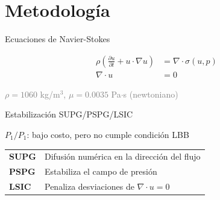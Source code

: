 \documentclass[aspectratio=169, 11pt]{beamer}
\begin{document}
\section{Metodología}

\begin{frame}{Ecuaciones de Navier-Stokes}

  \centering
  \vspace{0.3cm}
  \begin{align*}
    \rho\left(\frac{\partial u}{\partial t}+ u \cdot \nabla u\right) &= \nabla \cdot \sigma(u,p) \\
    \nabla \cdot u &= 0
  \end{align*}

  \vspace{0.3cm}
  \textcolor{gray}{\small $\rho = 1060$ kg/m$^3$, $\mu = 0.0035$ Pa$\cdot$s (newtoniano)}

  \vfill
\end{frame}

\begin{frame}{Estabilización SUPG/PSPG/LSIC}

  \centering
  \vfill
  {\small $P_1/P_1$: bajo costo, pero no cumple condici\'on LBB}

  \vspace{0.3cm}
  \begin{tabular}{ll}
    \textbf{SUPG} & Difusi\'on num\'erica en la direcci\'on del flujo \\
    \textbf{PSPG} & Estabiliza el campo de presi\'on \\
    \textbf{LSIC} & Penaliza desviaciones de $\nabla \cdot u = 0$
  \end{tabular}

  \vfill
\end{frame}
\end{document}
